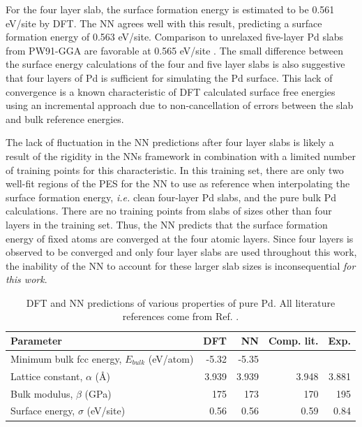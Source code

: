 \documentclass[12pt,oneside]{cmuthesis}
\begin{document}
For the four layer slab, the surface formation energy is estimated to be 0.561 eV/site by DFT. The NN agrees well with this result, predicting a surface formation energy of 0.563 eV/site. Comparison to unrelaxed five-layer Pd slabs from PW91-GGA are favorable at 0.565 eV/site \cite{frey-2014-implic-cover}. The small difference between the surface energy calculations of the four and five layer slabs is also suggestive that four layers of Pd is sufficient for simulating the Pd surface. This lack of convergence is a known characteristic of DFT calculated surface free energies using an incremental approach \cite{fiolhais-2003-extrac-alumin} due to non-cancellation of errors between the slab and bulk reference energies.

The lack of fluctuation in the NN predictions after four layer slabs is likely a result of the rigidity in the NNs framework in combination with a limited number of training points for this characteristic. In this training set, there are only two well-fit regions of the PES for the NN to use as reference when interpolating the surface formation energy, \emph{i.e.} clean four-layer Pd slabs, and the pure bulk Pd calculations. There are no training points from slabs of sizes other than four layers in the training set. Thus, the NN predicts that the surface formation energy of fixed atoms are converged at the four atomic layers. Since four layers is observed to be converged and only four layer slabs are used throughout this work, the inability of the NN to account for these larger slab sizes is inconsequential \emph{for this work}.

\begin{table}[h]
\caption{\label{tbl-properties}
DFT and NN predictions of various properties of pure Pd. All literature references come from Ref. .}
\centering
\begin{tabular}{lrrrr}
Parameter & DFT & NN & Comp. lit. & Exp.\\
\hline
Minimum bulk fcc energy, \(E_{bulk}\) (eV/atom) & -5.32 & -5.35 &  & \\
Lattice constant, \(\alpha\) (\AA{}) & 3.939 & 3.939 & 3.948 & 3.881\\
Bulk modulus, \(\beta\) (GPa) & 175 & 173 & 170 & 195\\
Surface energy, \(\sigma\) (eV/site) & 0.56 & 0.56 & 0.59 & 0.84\\
\end{tabular}
\end{table}
\end{document}
